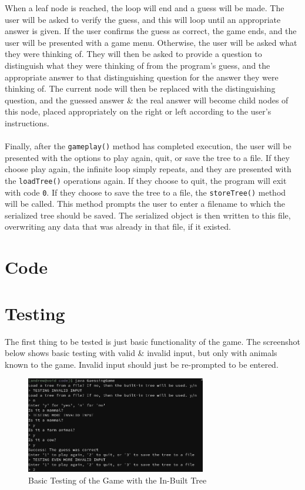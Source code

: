 \documentclass[a4paper]{article}
\begin{document}
When a leaf node is reached, the loop will end and a guess will be made. 
The user will be asked to verify the guess, and this will loop until an appropriate answer is given.
If the user confirms the guess as correct, the game ends, and the user will be presented with a game menu. 
Otherwise, the user will be asked what they were thinking of. 
They will then be asked to provide a question to distinguish what they were thinking of from the program's guess, and the appropriate answer to that distinguishing question for the answer they were thinking of. 
The current node will then be replaced with the distinguishing question, and the guessed answer \& the real answer will become child nodes of this node, placed appropriately on the right or left according 
to the user's instructions.
\\\\
Finally, after the \verb|gameplay()| method has completed execution, the user will be presented with the options to play again, quit, or save the tree to a file.
If they choose play again, the infinite loop simply repeats, and they are presented with the \verb|loadTree()| operations again. 
If they choose to quit, the program will exit with code \verb|0|. 
If they choose to save the tree to a file, the \verb|storeTree()| method will be called.
This method prompts the user to enter a filename to which the serialized tree should be saved. 
The serialized object is then written to this file, overwriting any data that was already in that file, if it existed.

\section{Code}


\newpage
\section{Testing}
The first thing to be tested is just basic functionality of the game. 
The screenshot below shows basic testing with valid \& invalid input, but only with animals known to the game.
Invalid input should just be re-prompted to be entered.
\begin{figure}[h]
    \centering \includegraphics[width=0.7\textwidth]{./images/first.png}
    \caption{Basic Testing of the Game with the In-Built Tree}
\end{figure}
\end{document}
